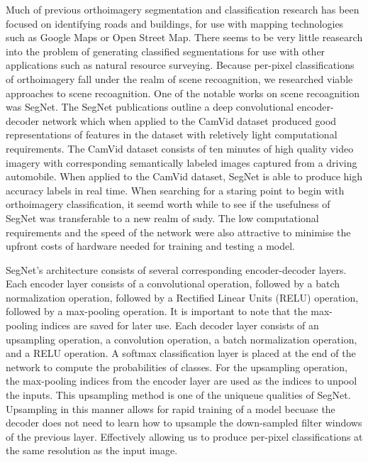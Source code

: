 \documentclass[12pt]{article}
\begin{document}
Much of previous orthoimagery segmentation and classification research has been focused on identifying roads and buildings, for use with mapping technologies such as Google Maps or Open Street Map. There seems to be very little reasearch into the problem of generating classified segmentations for use with other applications such as natural resource surveying. Because per-pixel classifications of orthoimagery fall under the realm of scene recoagnition, we researched viable approaches to scene recoagnition. One of the notable works on scene recoagnition was SegNet. The SegNet publications outline a deep convolutional encoder-decoder network which when applied to the CamVid dataset produced good representations of features in the dataset with reletively light computational requirements. The CamVid dataset consists of ten minutes of high quality video imagery with corresponding semantically labeled images captured from a driving automobile. When applied to the CamVid dataset, SegNet is able to produce high accuracy labels in real time. When searching for a staring point to begin with orthoimagery classification, it seemd worth while to see if the usefulness of SegNet was transferable to a new realm of sudy. The low computational requirements and the speed of the network were also attractive to minimise the upfront costs of hardware needed for training and testing a model.

SegNet's architecture\cite{SegNet} consists of several corresponding encoder-decoder layers. Each encoder layer consists of a convolutional operation, followed by a batch normalization operation, followed by a Rectified Linear Units (RELU) operation, followed by a max-pooling operation. It is important to note that the max-pooling indices are saved for later use. Each decoder layer consists of an upsampling operation, a convolution operation, a batch normalization operation, and a RELU operation. A softmax classification layer is placed at the end of the network to compute the probabilities of classes. For the upsampling operation, the max-pooling indices from the encoder layer are used as the indices to unpool the inputs. This upsampling method is one of the uniqueue qualities of SegNet. Upsampling in this manner allows for rapid training of a model becuase the decoder does not need to learn how to upsample the down-sampled filter windows of the previous layer. Effectively allowing us to produce per-pixel classifications at the same resolution as the input image.


\newpage
\end{document}
